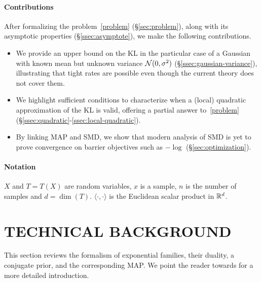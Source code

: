 \paragraph{Contributions}
After formalizing the problem~\eqref{problem} (\S\ref{sec:problem}), along with its asymptotic properties (\S\ref{ssec:asymptote}), we make the following contributions.
\begin{itemize}
	\itemsep0em
	\item We provide an upper bound on the KL in the particular case of a Gaussian with known mean but unknown variance ${\mathcal N}(0,\sigma^2)$ (\S\ref{ssec:gaussian-variance}), illustrating that tight rates are possible even though the current theory does not cover them.
	\item We highlight sufficient conditions to characterize when a (local) quadratic approximation of the KL is valid, offering a partial answer to~\eqref{problem} (\S\ref{ssec:quadratic}-\ref{ssec:local-quadratic}).
	\item By linking MAP and SMD, we show that modern analysis of SMD is yet to prove convergence on barrier objectives such as $-\log$ (\S\ref{sec:optimization}).
\end{itemize}


\paragraph{Notation}
$X$ and $T=T(X)$ are random variables, $x$ is a sample, $n$ is the number of samples and $d= \dim(T)$.
$\langle \cdot , \cdot \rangle$ is the Euclidean scalar product in $\mathbb{R}^d$.


\section{TECHNICAL BACKGROUND}
\label{sec:background}
This section reviews the formalism of exponential families, their duality, a conjugate prior, and the corresponding MAP.
We point the reader towards \citet[Chapter 3]{wainwright2008graphical} for a more detailed introduction.


